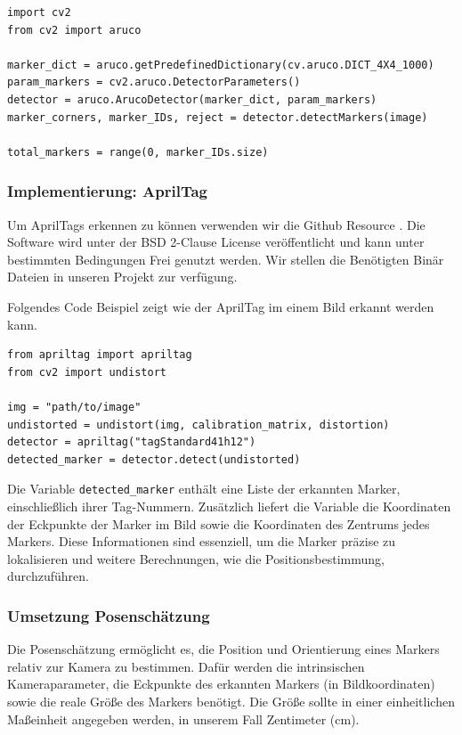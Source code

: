 \begin{lstlisting}
import cv2
from cv2 import aruco

marker_dict = aruco.getPredefinedDictionary(cv.aruco.DICT_4X4_1000)
param_markers = cv2.aruco.DetectorParameters()
detector = aruco.ArucoDetector(marker_dict, param_markers)
marker_corners, marker_IDs, reject = detector.detectMarkers(image)

total_markers = range(0, marker_IDs.size)
\end{lstlisting}


\subsubsection{Implementierung: AprilTag}
Um AprilTags erkennen zu können verwenden wir die Github Resource \cite{apriltag_github}.
Die Software wird unter der BSD 2-Clause License veröffentlicht und kann unter bestimmten Bedingungen
Frei genutzt werden. Wir stellen die Benötigten Binär Dateien in unseren Projekt zur verfügung.

Folgendes Code Beispiel zeigt wie der AprilTag im einem Bild erkannt werden kann.


\begin{lstlisting}
from apriltag import apriltag
from cv2 import undistort

img = "path/to/image"
undistorted = undistort(img, calibration_matrix, distortion)
detector = apriltag("tagStandard41h12")
detected_marker = detector.detect(undistorted)
\end{lstlisting}


Die Variable \texttt{detected\_marker} enthält eine Liste der erkannten Marker, einschließlich ihrer Tag-Nummern.
Zusätzlich liefert die Variable die Koordinaten der Eckpunkte der Marker im Bild sowie 
die Koordinaten des Zentrums jedes Markers. Diese Informationen sind essenziell, um die Marker 
präzise zu lokalisieren und weitere Berechnungen, wie die Positionsbestimmung, durchzuführen.



\subsubsection{Umsetzung Posenschätzung}
Die Posenschätzung ermöglicht es, die Position und Orientierung eines Markers relativ zur Kamera
zu bestimmen. Dafür werden die intrinsischen Kameraparameter, die Eckpunkte des erkannten 
Markers (in Bildkoordinaten) sowie die reale Größe des Markers benötigt. Die Größe sollte 
in einer einheitlichen Maßeinheit angegeben werden, in unserem Fall Zentimeter (cm). \clearpage


